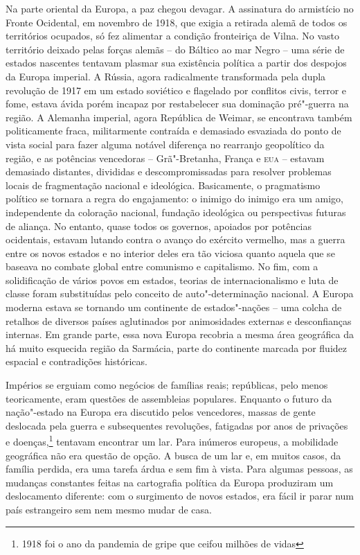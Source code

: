 Na parte oriental da Europa, a paz chegou devagar. A assinatura do
armistício no Fronte Ocidental, em novembro de 1918, que exigia a
retirada alemã de todos os territórios ocupados, só fez alimentar a
condição fronteiriça de Vilna. No vasto território deixado pelas forças
alemãs -- do Báltico ao mar Negro -- uma série de estados nascentes
tentavam plasmar sua existência política a partir dos despojos da Europa
imperial. A Rússia, agora radicalmente transformada pela dupla revolução
de 1917 em um estado soviético e flagelado por conflitos civis, terror e
fome, estava ávida porém incapaz por restabelecer sua dominação
pré"-guerra na região. A Alemanha imperial, agora República de Weimar, se
encontrava também politicamente fraca, militarmente contraída e
demasiado esvaziada do ponto de vista social para fazer alguma notável
diferença no rearranjo geopolítico da região, e as potências vencedoras
-- Grã"-Bretanha, França e \textsc{eua} -- estavam demasiado distantes, divididas e
descompromissadas para resolver problemas locais de fragmentação
nacional e ideológica. Basicamente, o pragmatismo político se tornara a
regra do engajamento: o inimigo do inimigo era um amigo, independente da
coloração nacional, fundação ideológica ou perspectivas futuras de
aliança. No entanto, quase todos os governos, apoiados por potências
ocidentais, estavam lutando contra o avanço do exército vermelho, mas a
guerra entre os novos estados e no interior deles era tão viciosa quanto
aquela que se baseava no combate global entre comunismo e capitalismo.
No fim, com a solidificação de vários povos em estados, teorias de
internacionalismo e luta de classe foram substituídas pelo conceito de
auto"-determinação nacional. A Europa moderna estava se tornando um
continente de estados"-nações -- uma colcha de retalhos de diversos países
aglutinados por animosidades externas e desconfianças internas. Em
grande parte, essa nova Europa recobria a mesma área geográfica da há
muito esquecida região da Sarmácia, parte do continente marcada por
fluidez espacial e contradições históricas.

Impérios se erguiam como negócios de famílias reais; repúblicas, pelo
menos teoricamente, eram questões de assembleias populares. Enquanto o
futuro da nação"-estado na Europa era discutido pelos vencedores, massas
de gente deslocada pela guerra e subsequentes revoluções, fatigadas por
anos de privações e doenças,\footnote{1918 foi o ano da pandemia de gripe que
ceifou milhões de vidas} tentavam encontrar um lar. Para inúmeros
europeus, a mobilidade geográfica não era questão de opção. A busca de
um lar e, em muitos casos, da família perdida, era uma tarefa árdua e
sem fim à vista. Para algumas pessoas, as mudanças constantes feitas na
cartografia política da Europa produziram um deslocamento diferente: com
o surgimento de novos estados, era fácil ir parar num país estrangeiro
sem nem mesmo mudar de casa.

